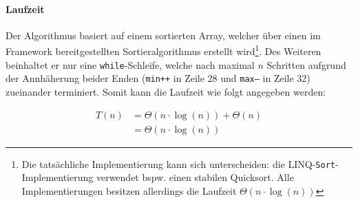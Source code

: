 \paragraph*{Laufzeit}
Der Algorithmus basiert auf einem sortierten Array, welcher über einen im Framework bereitgestellten Sortieralgorithmus erstellt wird\footnote{Die tatsächliche Implementierung kann sich unterscheiden: die LINQ-\texttt{Sort}-Implementierung verwendet bspw. einen stabilen Quicksort. Alle Implementierungen besitzen allerdings die Laufzeit $\Theta(n\cdot\log(n))$}. Des Weiteren beinhaltet er nur eine \texttt{while}-Schleife, welche nach maximal $n$ Schritten aufgrund der Annhäherung beider Enden (\texttt{min++} in Zeile 28 und \texttt{max--} in Zeile 32) zueinander terminiert. Somit kann die Laufzeit wie folgt angegeben werden:

\begin{align*}
	T(n) &= \Theta(n \cdot \log(n)) + \Theta(n) \\
    &= \Theta(n \cdot \log(n))
\end{align*}